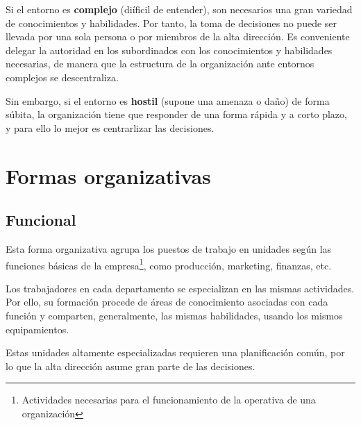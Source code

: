 \documentclass[12pt,a4paper,spanish]{report}
\begin{document}
			Si el entorno es \textbf{complejo} (diíficil de entender), son necesarios una gran variedad de conocimientos y habilidades. Por tanto, la toma de decisiones no puede ser llevada por una sola persona o por miembros de la alta dirección. Es conveniente delegar la autoridad en los subordinados con los conocimientos y habilidades necesarias, de manera que la estructura de la organización ante entornos complejos se descentraliza.

			Sin embargo, si el entorno es \textbf{hostil} (supone una amenaza o daño) de forma súbita, la organización tiene que responder de una forma rápida y a corto plazo, y para ello lo mejor es centrarlizar las decisiones.

	\section{\textcolor[rgb]{0.5,0.1,0.4}Formas organizativas}
		\subsection{\textcolor[rgb]{0.5,0.1,0.4}Funcional}
			Esta forma organizativa agrupa los puestos de trabajo en unidades según las funciones básicas de la empresa\footnote{Actividades necesarias para el funcionamiento de la operativa de una organización}, como producción, marketing, finanzas, etc.

			Los trabajadores en cada departamento se especializan en las mismas actividades. Por ello, su formación procede de áreas de conocimiento asociadas con cada función y comparten, generalmente, las mismas habilidades, usando los mismos equipamientos.

			Estas unidades altamente especializadas requieren una planificación común, por lo que la alta dirección asume gran parte de las decisiones.
\end{document}

